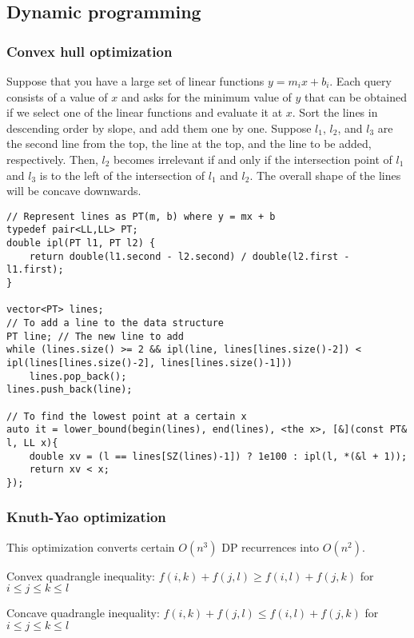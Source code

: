 \documentclass[letterpaper]{article}
\begin{document}
\clearpage

\subsection{Dynamic programming}

\subsubsection{Convex hull optimization}

Suppose that you have a large set of linear functions $y = m_i x + b_i$. Each query consists of a value of $x$ and asks for the minimum value of $y$ that can be obtained if we select one of the linear functions and evaluate it at $x$. Sort the lines in descending order by slope, and add them one by one. Suppose $l_1$, $l_2$, and $l_3$ are the second line from the top, the line at the top, and the line to be added, respectively. Then, $l_2$ becomes irrelevant if and only if the intersection point of $l_1$ and $l_3$ is to the left of the intersection of $l_1$ and $l_2$. The overall shape of the lines will be concave downwards.

\begin{lstlisting}
// Represent lines as PT(m, b) where y = mx + b
typedef pair<LL,LL> PT;
double ipl(PT l1, PT l2) {
	return double(l1.second - l2.second) / double(l2.first - l1.first);
}

vector<PT> lines;
// To add a line to the data structure
PT line; // The new line to add
while (lines.size() >= 2 && ipl(line, lines[lines.size()-2]) < ipl(lines[lines.size()-2], lines[lines.size()-1]))
	lines.pop_back();
lines.push_back(line);

// To find the lowest point at a certain x
auto it = lower_bound(begin(lines), end(lines), <the x>, [&](const PT& l, LL x){
	double xv = (l == lines[SZ(lines)-1]) ? 1e100 : ipl(l, *(&l + 1));
	return xv < x;
});
\end{lstlisting}

\subsubsection{Knuth-Yao optimization}

This optimization converts certain $O(n^3)$ DP recurrences into $O(n^2)$.

Convex quadrangle inequality: $f(i,k) + f(j,l) \geq f(i,l) + f(j,k)$ for $i \leq j \leq k \leq l$

Concave quadrangle inequality: $f(i,k) + f(j,l) \leq f(i,l) + f(j,k)$ for $i \leq j \leq k \leq l$
\end{document}
